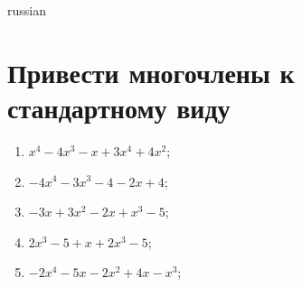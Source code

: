 \documentclass[a4paper]{article}
\begin{document}
\begin{otherlanguage*}{russian}

\section{Привести многочлены к стандартному виду}
\begin{enumerate}
\item $x^4 - 4x^3 - x + 3x^4 + 4x^2$;
\item $-4x^4 - 3x^3 - 4 - 2x + 4$;
\item $-3x + 3x^2 - 2x + x^3 - 5$;
\item $2x^3 - 5 + x + 2x^3 - 5$;
\item $-2x^4 - 5x - 2x^2 + 4x - x^3$;
\end{enumerate}
\end{otherlanguage*}
\end{document}
